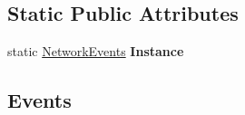 \subsection*{Static Public Attributes}
\begin{DoxyCompactItemize}
\item 
\hypertarget{class_skyrates_1_1_common_1_1_network_1_1_network_events_a215cb6aa6597c68e333787856f6ef220}{static \hyperlink{class_skyrates_1_1_common_1_1_network_1_1_network_events}{Network\-Events} {\bfseries Instance}}\label{class_skyrates_1_1_common_1_1_network_1_1_network_events_a215cb6aa6597c68e333787856f6ef220}

\end{DoxyCompactItemize}
\subsection*{Events}
